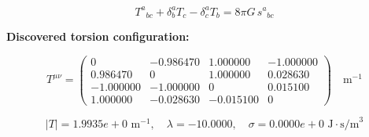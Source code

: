 
\begin{equation}
  T^a{}_{bc} + \delta^a_b T_c - \delta^a_c T_b = 8\pi G \, s^a{}_{bc}
\end{equation}

\textbf{Discovered torsion configuration:}

\begin{equation}
  T^{\mu\nu} = \begin{pmatrix}
    0 & -0.986470 & 1.000000 & -1.000000 \\
    0.986470 & 0 & 1.000000 & 0.028630 \\
    -1.000000 & -1.000000 & 0 & 0.015100 \\
    1.000000 & -0.028630 & -0.015100 & 0
  \end{pmatrix} \quad \text{m}^{-1}
\end{equation}

\begin{equation}
  |T| = 1.9935e+0 \text{ m}^{-1}, \quad
  \lambda = -10.0000, \quad
  \sigma = 0.0000e+0 \text{ J}\cdot\text{s/m}^3
\end{equation}